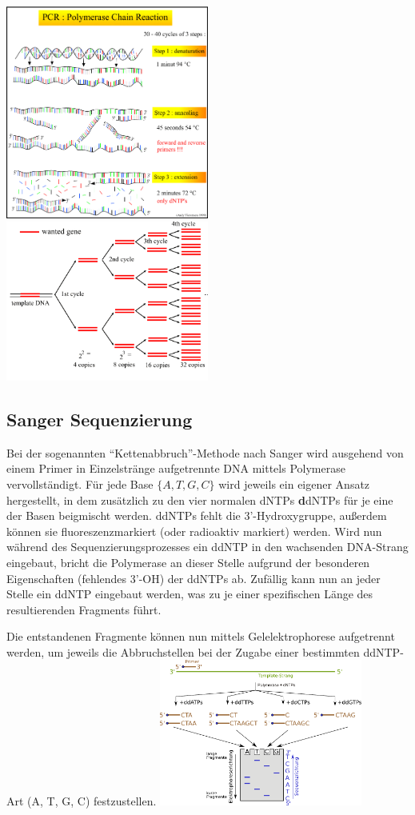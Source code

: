\includegraphics[width=0.5\textwidth]{lectures/V2/pix/pcr1.png}
\includegraphics[width=0.5\textwidth]{lectures/V2/pix/pcr2.png}

\subsection{Sanger Sequenzierung}
Bei der sogenannten ``Kettenabbruch''-Methode nach Sanger wird ausgehend von einem Primer in Einzelstränge aufgetrennte DNA mittels Polymerase vervollständigt. Für jede Base $\{A, T, G, C\}$ wird jeweils ein eigener Ansatz hergestellt, in dem zusätzlich zu den vier normalen dNTPs \textbf{d}dNTPs für je eine der Basen beigmischt werden. ddNTPs fehlt die 3'-Hydroxygruppe, außerdem können sie fluoreszenzmarkiert (oder radioaktiv markiert) werden. Wird nun während des Sequenzierungsprozesses ein ddNTP in den wachsenden DNA-Strang eingebaut, bricht die Polymerase an dieser Stelle aufgrund der besonderen Eigenschaften (fehlendes 3'-OH) der ddNTPs ab. Zufällig kann nun an jeder Stelle ein ddNTP eingebaut werden, was zu je einer spezifischen Länge des resultierenden Fragments führt.

Die entstandenen Fragmente können nun mittels Gelelektrophorese aufgetrennt werden, um jeweils die Abbruchstellen bei der Zugabe einer bestimmten ddNTP-Art (A, T, G, C) festzustellen.
\includegraphics[width=0.5\textwidth]{lectures/V2/pix/Didesoxy-Methode.pdf}

